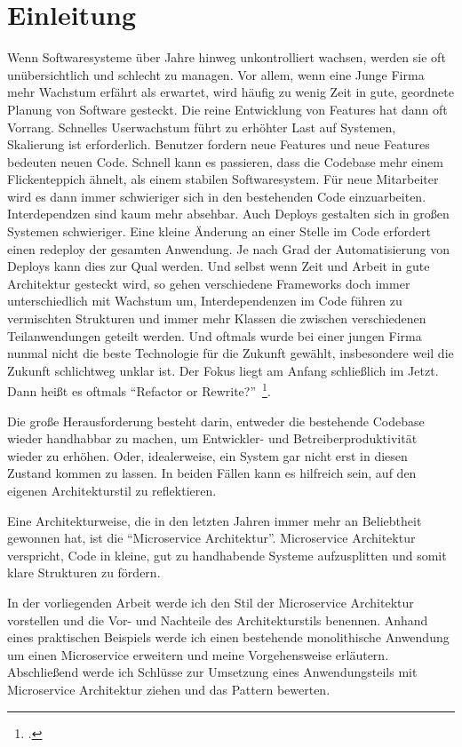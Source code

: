 \chapter{Einleitung}
Wenn Softwaresysteme über Jahre hinweg unkontrolliert wachsen, werden sie oft unübersichtlich und schlecht zu managen. Vor allem, wenn eine Junge Firma mehr Wachstum erfährt als erwartet, wird häufig zu wenig Zeit in gute, geordnete Planung von Software gesteckt. Die reine Entwicklung von Features hat dann oft Vorrang. Schnelles Userwachstum führt zu erhöhter Last auf Systemen, Skalierung ist erforderlich. Benutzer fordern neue Features und neue Features bedeuten neuen Code. Schnell kann es passieren, dass die Codebase mehr einem Flickenteppich ähnelt, als einem stabilen Softwaresystem. Für neue Mitarbeiter wird es dann immer schwieriger sich in den bestehenden Code einzuarbeiten. Interdependzen sind kaum mehr absehbar. Auch Deploys gestalten sich in großen Systemen schwieriger. Eine kleine Änderung an einer Stelle im Code erfordert einen redeploy der gesamten Anwendung. Je nach Grad der Automatisierung von Deploys kann dies zur Qual werden. Und selbst wenn Zeit und Arbeit in gute Architektur gesteckt wird, so gehen verschiedene Frameworks doch immer unterschiedlich mit Wachstum um, Interdependenzen im Code führen zu vermischten Strukturen und immer mehr Klassen die zwischen verschiedenen Teilanwendungen geteilt werden. Und oftmals wurde bei einer jungen Firma nunmal nicht die beste Technologie für die Zukunft gewählt, insbesondere weil die Zukunft schlichtweg unklar ist. Der Fokus liegt am Anfang schließlich im Jetzt. Dann heißt es oftmals ``Refactor or Rewrite?''~\footcite[vgl.][]{refactorrewrite}.

Die große Herausforderung besteht darin, entweder die bestehende Codebase wieder handhabbar zu machen, um Entwickler- und Betreiberproduktivität wieder zu erhöhen. Oder, idealerweise, ein System gar nicht erst in diesen Zustand kommen zu lassen. In beiden Fällen kann es hilfreich sein, auf den eigenen Architekturstil zu reflektieren.

Eine Architekturweise, die in den letzten Jahren immer mehr an Beliebtheit gewonnen hat, ist die ``Microservice Architektur''. Microservice Architektur verspricht, Code in kleine, gut zu handhabende Systeme aufzusplitten und somit klare Strukturen zu fördern.

In der vorliegenden Arbeit werde ich den Stil der Microservice Architektur vorstellen und die Vor- und Nachteile des Architekturstils benennen. Anhand eines praktischen Beispiels werde ich einen bestehende monolithische Anwendung um einen Microservice erweitern und meine Vorgehensweise erläutern.
Abschließend werde ich Schlüsse zur Umsetzung eines Anwendungsteils mit Microservice Architektur ziehen und das Pattern bewerten.